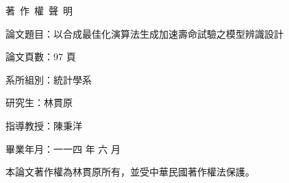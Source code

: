 \renewcommand\bibname{參考文獻}
\cleardoublepage



\appendix
\cleardoublepage


\cleardoublepage
\begin{center}
    \huge 著~作~權~聲~明
\end{center}

\vspace*{1cm}
論文題目：以合成最佳化演算法生成加速壽命試驗之模型辨識設計

論文頁數：97 頁

系所組別：統計學系

研究生：林貫原

指導教授：陳秉洋

畢業年月：一一四 年 六 月

本論文著作權為林貫原所有，並受中華民國著作權法保護。


